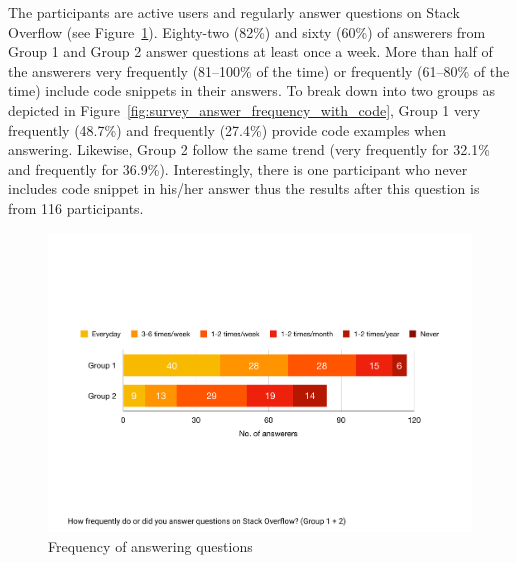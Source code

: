 \documentclass{svjour3}                     %
\begin{document}
The participants are active users and regularly answer questions on Stack
Overflow (see Figure~\ref{fig:survey_answer_frequency}). Eighty-two (82\%) and
sixty (60\%) of answerers from Group 1 and Group 2  answer questions at least
once a week. More than half of the answerers very frequently (81--100\% of the
time) or frequently (61--80\% of the time) include code snippets in their
answers. To break down into two groups as depicted in
Figure~\ref{fig:survey_answer_frequency_with_code}, Group 1 very frequently
(48.7\%) and frequently (27.4\%) provide code examples when answering. Likewise,
Group 2 follow the same trend (very frequently for 32.1\% and frequently for
36.9\%). Interestingly, there is one participant who never includes code snippet
in his/her answer thus the results after this question is from 116 participants.


\begin{figure}
		\centering
		\includegraphics[width=0.8\linewidth]{survey_answer_frequency}
		\caption{Frequency of answering questions}
		\label{fig:survey_answer_frequency}
\end{figure}

\end{document}
